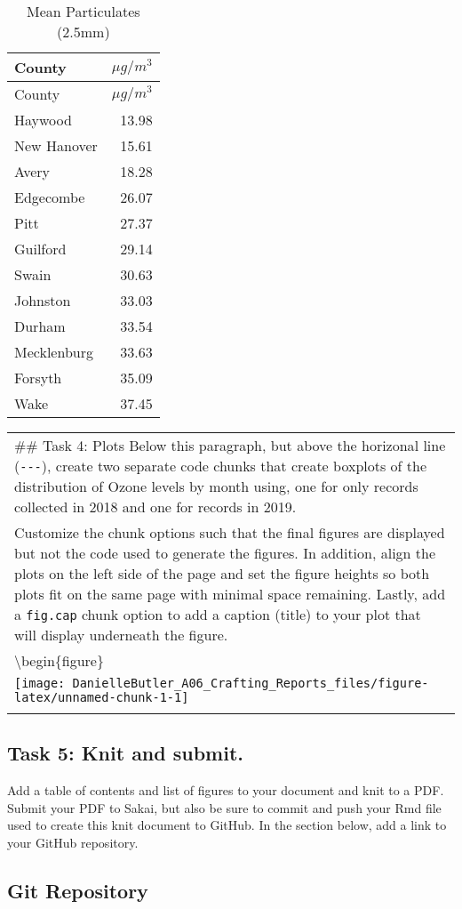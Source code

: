 \documentclass[
]{article}
\begin{document}
\begin{longtable}[]{@{}lr@{}}
\caption{Mean Particulates (2.5mm)}\tabularnewline
\toprule\noalign{}
County & \(\mu g/m^3\) \\
\midrule\noalign{}
\endfirsthead
\toprule\noalign{}
County & \(\mu g/m^3\) \\
\midrule\noalign{}
\endhead
\bottomrule\noalign{}
\endlastfoot
Haywood & 13.98 \\
New Hanover & 15.61 \\
Avery & 18.28 \\
Edgecombe & 26.07 \\
Pitt & 27.37 \\
Guilford & 29.14 \\
Swain & 30.63 \\
Johnston & 33.03 \\
Durham & 33.54 \\
Mecklenburg & 33.63 \\
Forsyth & 35.09 \\
Wake & 37.45 \\
\end{longtable}

\begin{longtable}[]{@{}
  >{\raggedright\arraybackslash}p{}@{}}
\toprule\noalign{}
\endhead
\bottomrule\noalign{}
\endlastfoot
\#\# Task 4: Plots Below this paragraph, but above the horizonal line
(\texttt{-\/-\/-}), create two separate code chunks that create boxplots
of the distribution of Ozone levels by month using, one for only records
collected in 2018 and one for records in 2019. \\
Customize the chunk options such that the final figures are displayed
but not the code used to generate the figures. In addition, align the
plots on the left side of the page and set the figure heights so both
plots fit on the same page with minimal space remaining. Lastly, add a
\texttt{fig.cap} chunk option to add a caption (title) to your plot that
will display underneath the figure. \\
\textbackslash begin\{figure\} \\
\texttt{[image: DanielleButler\_A06\_Crafting\_Reports\_files/figure-latex/unnamed-chunk-1-1]}
\hfill{} \\
 \\
\end{longtable}

\newpage

\subsection{Task 5: Knit and submit.}\label{task-5-knit-and-submit.}

Add a table of contents and list of figures to your document and knit to
a PDF. Submit your PDF to Sakai, but also be sure to commit and push
your Rmd file used to create this knit document to GitHub. In the
section below, add a link to your GitHub repository.

\listofffigures

\subsection{Git Repository}\label{git-repository}
\end{document}
